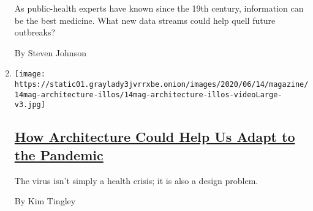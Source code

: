 \begin{enumerate}
  As public-health experts have known since the 19th century,
  information can be the best medicine. What new data streams could help
  quell future outbreaks?

  By Steven Johnson
\item
  \texttt{[image: https://static01.graylady3jvrrxbe.onion/images/2020/06/14/magazine/14mag-architecture-illos/14mag-architecture-illos-videoLarge-v3.jpg]}

  \hypertarget{how-architecture-could-help-us-adapt-to-the-pandemic}{%
  \subsection{\texorpdfstring{\href{/interactive/2020/06/09/magazine/architecture-covid.html}{How
  Architecture Could Help Us Adapt to the
  Pandemic}}{How Architecture Could Help Us Adapt to the Pandemic}}\label{how-architecture-could-help-us-adapt-to-the-pandemic}}

  The virus isn't simply a health crisis; it is also a design problem.

  By Kim Tingley
\end{enumerate}

